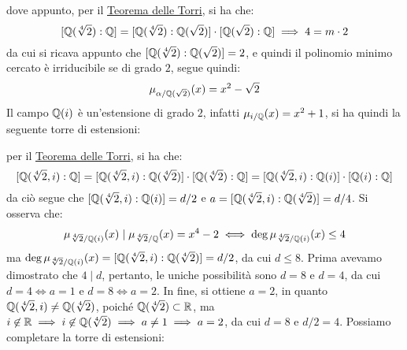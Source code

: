 \documentclass[11pt]{scrartcl}
\begin{document}
\begin{soln}
\begin{itemize}
\begin{center}
			\end{center}
dove appunto, per il \hyperref[es:Torri]{Teorema delle Torri}, si ha che:
		\[ [\mathbb Q(\sqrt[4]2) : \mathbb Q] = [\mathbb Q(\sqrt[4]2) : \mathbb Q(\sqrt 2)] \cdot [\mathbb Q(\sqrt 2) : \mathbb Q] \implies 4 = m \cdot 2
		\]
da cui si ricava appunto che $[\mathbb Q(\sqrt[4]2) : \mathbb Q(\sqrt 2)] = 2$, e quindi il polinomio minimo cercato è irriducibile se di grado $2$, segue quindi:
		\[ \mu_{\alpha/\mathbb Q(\sqrt 2)}(x) = x^2 - \sqrt 2
		\]
	\ii Il campo $\mathbb Q(i)$ è un'estensione di grado $2$, infatti $\mu_{i/\mathbb Q}(x) = x^2 +1$, si ha quindi la seguente torre di estensioni:
		\begin{center}
		\end{center}
per il \hyperref[es:Torri]{Teorema delle Torri}, si ha che:
	\[ [\mathbb Q(\sqrt[4]2, i) : \mathbb Q] = [\mathbb Q(\sqrt[4]2, i) : \mathbb Q(\sqrt[4]2)] \cdot [\mathbb Q(\sqrt[4]2) : \mathbb Q] = [\mathbb Q(\sqrt[4]2, i):\mathbb Q(i)] \cdot [\mathbb Q(i) : \mathbb Q]
	\]
da ciò segue che $ [\mathbb Q(\sqrt[4]2, i):\mathbb Q(i)] = d/2$ e $a =  [\mathbb Q(\sqrt[4]2, i) : \mathbb Q(\sqrt[4]2)] = d/4$. Si osserva che:
		\[ \mu_{\sqrt[4]2/\mathbb Q(i)}(x) \mid \mu_{\sqrt[4]2/\mathbb Q}(x) = x^4 - 2 \iff \deg\mu_{\sqrt[4]2/\mathbb Q(i)}(x) \leq 4
		\]
ma $ \deg\mu_{\sqrt[4]2/\mathbb Q(i)}(x) = [\mathbb Q(\sqrt[4]2,i) : \mathbb Q(\sqrt[4]2)] = d/2$, da cui $d \leq 8$. Prima avevamo dimostrato che $4 \mid d$, pertanto, le uniche possibilità sono $d=8$ e $d=4$, da cui $d=4 \iff a = 1$ e $d = 8 \iff a = 2$. In fine, si ottiene $a=2$, in quanto $\mathbb Q(\sqrt[4]2, i) \ne \mathbb Q(\sqrt[4]2)$, poiché $\mathbb Q(\sqrt[4]2) \subset \mathbb R$, ma $i \not\in \mathbb R \implies i \not\in \mathbb Q(\sqrt[4]{2}) \implies a \ne 1 \implies a = 2$, da cui $d=8$ e $d/2 = 4$. Possiamo completare la torre di estensioni:
	\begin{center}
\end{center}
\end{itemize}
\end{soln}
\end{document}
